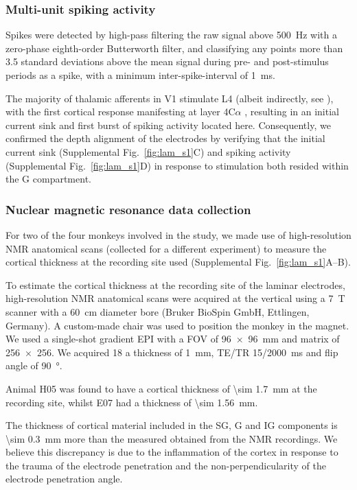 \subsubsection{Multi-unit spiking activity}

Spikes were detected by high-pass filtering the raw signal above \SI{500}{Hz} with a zero-phase eighth-order Butterworth filter, and classifying any points more than 3.5 standard deviations above the mean signal during pre- and post-stimulus periods as a spike, with a minimum inter-spike-interval of \SI{1}{\milli\second}.

The majority of thalamic afferents in \ac{V1} stimulate \ac{L4} (albeit indirectly, see \citealp{Hansen2012}), with the first cortical response manifesting at layer 4C$\alpha$ \citep{Callaway1998}, resulting in an initial current sink and first burst of spiking activity located here.
Consequently, we confirmed the depth alignment of the electrodes by verifying that the initial current sink (Supplemental Fig.~\ref{fig:lam_s1}C) and spiking activity (Supplemental Fig.~\ref{fig:lam_s1}D) in response to stimulation both resided within the \ac{G} compartment.

\subsubsection{Nuclear magnetic resonance data collection}

For two of the four monkeys involved in the study, we made use of high-resolution \ac{NMR} anatomical scans (collected for a different experiment) to measure the cortical thickness at the recording site used (Supplemental Fig.~\ref{fig:lam_s1}A--B).

To estimate the cortical thickness at the recording site of the laminar electrodes, high-resolution \ac{NMR} anatomical scans were acquired at the vertical using a \SI{7}{T} scanner with a \SI{60}{\centi\metre} diameter bore (Bruker BioSpin GmbH, Ettlingen, Germany).
A custom-made chair was used to position the monkey in the magnet.
We used a single-shot gradient \ac{EPI} with a \ac{FOV} of \SI{96x96}{\milli\metre} and matrix of \num{256x256}.
We acquired 18 a thickness of \SI{1}{\milli\metre}, TE/TR 15/\SI{2000}{\milli\second} and flip angle of \SI{90}{\degree}.

Animal H05 was found to have a cortical thickness of \SI{\sim 1.7}{mm} at the recording site, whilst E07 had a thickness of \SI{\sim 1.56}{mm}.

The thickness of cortical material included in the \ac{SG}, \ac{G} and \ac{IG} components is \SI{\sim 0.3}{mm} more than the measured obtained from the \ac{NMR} recordings.
We believe this discrepancy is due to the inflammation of the cortex in response to the trauma of the electrode penetration and the non-perpendicularity of the electrode penetration angle.


